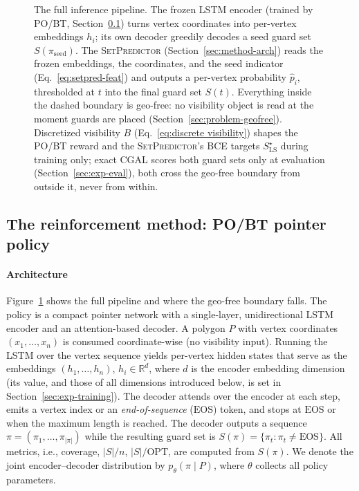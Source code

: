 \documentclass[11pt]{article}
\newcommand{\EOS}{\mathrm{EOS}}
\newcommand{\OPT}{\mathrm{OPT}}
\newcommand{\SetPredictor}{\textup{\textsc{SetPredictor}}}
\begin{document}
\begin{figure}[!ht]
  \centering
  \caption{The full inference pipeline. The frozen LSTM encoder (trained by PO/BT, Section~\ref{sec:method-pointer}) turns vertex coordinates into per-vertex embeddings $h_i$; its own decoder greedily decodes a seed guard set $S(\pi_{\mathrm{seed}})$. The \SetPredictor{} (Section~\ref{sec:method-arch}) reads the frozen embeddings, the coordinates, and the seed indicator (Eq.~\eqref{eq:setpred-feat}) and outputs a per-vertex probability $\hat p_i$, thresholded at $t$ into the final guard set $S(t)$. Everything inside the dashed boundary is geo-free: no visibility object is read at the moment guards are placed (Section~\ref{sec:problem-geofree}). Discretized visibility $B$ (Eq.~\eqref{eq:discrete visibility}) shapes the PO/BT reward and the \SetPredictor{}'s BCE targets $S^\star_{\mathrm{LS}}$ during training only; exact CGAL scores both guard sets only at evaluation (Section~\ref{sec:exp-eval}), both cross the geo-free boundary from outside it, never from within.}
  \label{fig:architecture}
\end{figure}

\subsection{The reinforcement method: PO/BT pointer policy}
\label{sec:method-pointer}

\paragraph{Architecture} Figure~\ref{fig:architecture} shows the full pipeline and where the geo-free boundary falls. The policy is a compact pointer network with a single-layer, unidirectional LSTM~\cite{Hochreiter1997LSTM} encoder and an attention-based decoder. A polygon $P$ with vertex coordinates $(x_1, \dots, x_n)$ is consumed coordinate-wise (no visibility input). Running the LSTM over the vertex sequence yields per-vertex hidden states that serve as the embeddings $(h_1, \dots, h_n)$, $h_i \in \mathbb{R}^{d}$, where $d$ is the encoder embedding dimension (its value, and those of all dimensions introduced below, is set in Section~\ref{sec:exp-training}). The decoder attends over the encoder at each step, emits a vertex index or an \emph{end-of-sequence} ($\EOS$) token, and stops at $\EOS$ or when the maximum length is reached. The decoder outputs a sequence $\pi = (\pi_1, \dots, \pi_{|\pi|})$ while the resulting guard set is $S(\pi) = \{\pi_t : \pi_t \ne \EOS\}$. All metrics, i.e., coverage, $|S|/n$, $|S|/\OPT$, are computed from $S(\pi)$. We denote the joint encoder--decoder distribution by $p_\theta(\pi \mid P)$, where $\theta$ collects all policy parameters.
\end{document}
